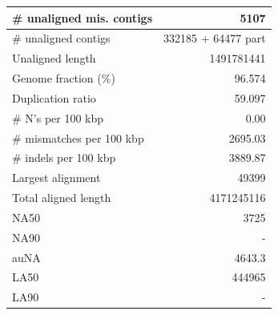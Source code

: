\documentclass[12pt,a4paper]{article}
\begin{document}
\begin{table}[ht]
\begin{center}
\begin{tabular}{|l*{1}{|r}|}
\# unaligned mis. contigs & 5107 \\ \hline
\# unaligned contigs & 332185 + 64477 part \\ \hline
Unaligned length & 1491781441 \\ \hline
Genome fraction (\%) & 96.574 \\ \hline
Duplication ratio & 59.097 \\ \hline
\# N's per 100 kbp & 0.00 \\ \hline
\# mismatches per 100 kbp & 2695.03 \\ \hline
\# indels per 100 kbp & 3889.87 \\ \hline
Largest alignment & 49399 \\ \hline
Total aligned length & 4171245116 \\ \hline
NA50 & 3725 \\ \hline
NA90 & - \\ \hline
auNA & 4643.3 \\ \hline
LA50 & 444965 \\ \hline
LA90 & - \\ \hline
\end{tabular}
\end{center}
\end{table}
\end{document}
